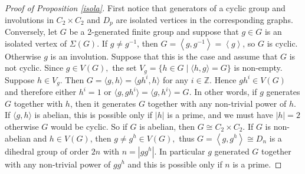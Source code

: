 \documentclass{amsart}
\newcommand{\gen}[1]{\left\langle#1\right\rangle}
\numberwithin{equation}{section}
\begin{document}
\begin{proof}[Proof of Proposition \ref{isola}]First notice that
 generators of a cyclic group and  involutions in $C_2\times C_2$ and $D_p$
 are isolated vertices in the corresponding graphs. Conversely, let $G$ be a 2-generated finite group and suppose that $g\in G$ is an isolated vertex of $\Sigma(G)$. If $g\neq g^{-1}$, then $G=\gen{g,g^{-1}}=\gen{g}$, so $G$ is cyclic. Otherwise $g$ is an involution.
 Suppose that this is the case and assume  that $G$ is not cyclic.
 Since $g \in V(G),$ the set $V_g=\{h \in G\mid \langle h, g\rangle=G\}$ is non-empty. Suppose $h \in V_g.$ Then $G=\langle g,h\rangle = \langle gh^i, h\rangle$ for any $i \in \mathbb Z.$ Hence $gh^i \in V(G)$ and therefore either $h^i=1$ or $\langle g, gh^i\rangle=\langle g, h^i\rangle=G$. In other words, if $g$ generates $G$ together with $h$, then it generates $G$ together with any non-trivial power of $h.$ If $\langle g,h \rangle$ is abelian, this is possible only if $|h|$ is a prime, and we must have $|h|=2$ otherwise $G$ would be cyclic. So if $G$ is abelian, then $G\cong C_2\times C_2.$
If $G$ is non-abelian and $h \in V(G)$, then $g\neq g^h \in V(G),$
thus  $G=\gen{g,g^h}\cong D_n$ is a dihedral group of order $2n$ with $n=|gg^h|.$ In particular $g$ generated $G$ together with any non-trivial power of $gg^h$ and this is possible only if $n$ is a prime.
\end{proof}
\end{document}
